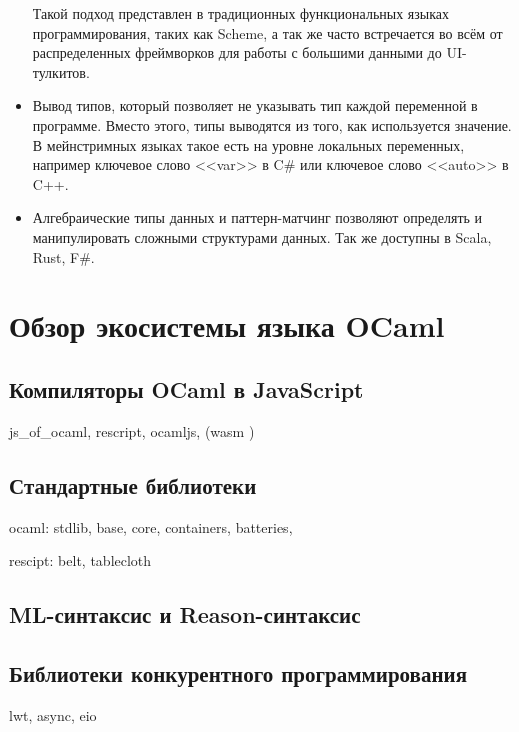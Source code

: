\begin{itemize}
            Такой подход представлен в традиционных функциональных языках программирования, таких как Scheme, а так же часто встречается
            во всём от распределенных фреймворков для работы с большими данными до UI-тулкитов.
      \item Вывод типов, который позволяет не указывать тип каждой переменной в программе.
            Вместо этого, типы выводятся из того, как используется значение. В мейнстримных языках
            такое есть на уровне локальных переменных, например ключевое слово <<var>> в C\# или ключевое слово <<auto>> в C++.
      \item Алгебраические типы данных и паттерн-матчинг позволяют определять и манипулировать сложными структурами данных.
            Так же доступны в Scala, Rust, F\#.

\end{itemize}

\section{Обзор экосистемы языка OCaml}

\TODO

\subsection{Компиляторы OCaml в JavaScript}\label{jsoo}

js\_of\_ocaml, rescript, ocamljs, (wasm \TODO) \TODO

\subsection{Стандартные библиотеки}

\TODO

ocaml: stdlib, base, core, containers, batteries,

rescipt: belt, tablecloth

\subsection{ML-синтаксис и Reason-синтаксис}

\TODO

\subsection{Библиотеки конкурентного программирования}

lwt, async, eio \TODO

